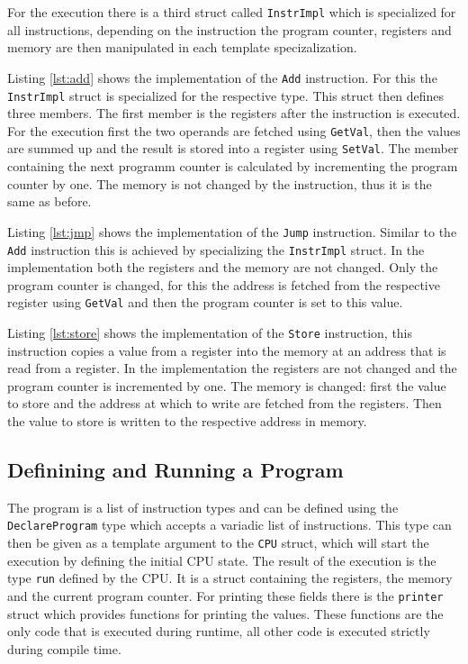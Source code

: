For the execution there is a third struct called \lstinline{InstrImpl} which is
specialized for all instructions, depending on the instruction the program counter,
registers and memory are then manipulated in each template specizalization.

Listing \ref{lst:add} shows the implementation of the \lstinline{Add} instruction.
For this the \lstinline{InstrImpl} struct is specialized for the respective type.
This struct then defines three members. The first member is the registers after the
instruction is executed. For the execution first the two operands are fetched using
\lstinline{GetVal}, then the values are summed up and the result is stored into a
register using \lstinline{SetVal}. The member containing the next programm counter
is calculated by incrementing the program counter by one. The memory is not
changed by the instruction, thus it is the same as before.



Listing \ref{lst:jmp} shows the implementation of the \lstinline{Jump} instruction.
Similar to the \lstinline{Add} instruction this is achieved by specializing the 
\lstinline{InstrImpl} struct. In the implementation both the registers and the memory
are not changed. Only the program counter is changed, for this the address is fetched
from the respective register using \lstinline{GetVal} and then the program counter is
set to this value.



Listing \ref{lst:store} shows the implementation of the \lstinline{Store} instruction,
this instruction copies a value from a register into the memory at an address that is
read from a register.
In the implementation the registers are not changed and the program counter is incremented
by one. The memory is changed: first the value to store and the address at which to write
are fetched from the registers. Then the value to store is written to the respective address in memory.



\subsection{Definining and Running a Program}
The program is a list of instruction types and can be defined using the 
\lstinline{DeclareProgram} type which accepts a variadic list of instructions. 
This type can then be given as a template argument to the \lstinline{CPU} struct, which will start the execution by defining
the initial CPU state. The result of the execution is the type \lstinline{run} defined
by the CPU. It is a struct containing the registers, the memory and the current program
counter. For printing these fields there is the \lstinline{printer} struct which
provides functions for printing the values. These functions are the only code that is
executed during runtime, all other code is executed strictly during compile time.

